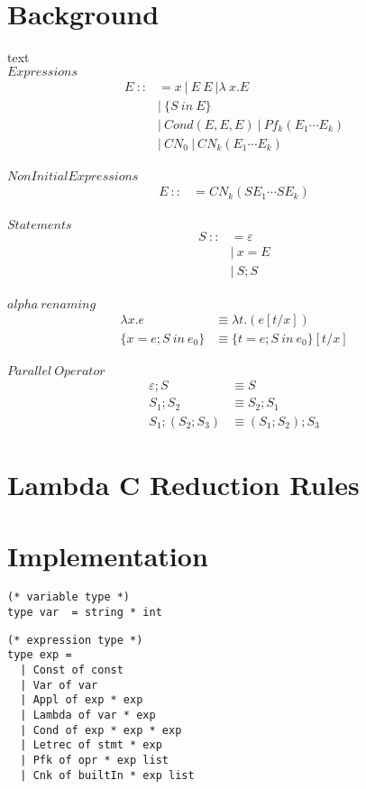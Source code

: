 \documentclass[preprint]{sigplanconf}
\begin{document}
\section{Background}
text 
\\
$Expressions$ \cite{lambdas}
\begin{align}
E\ ::&= x\ |\ E\ E\ | \lambda\ x.E \\
&|\ \lbrace S\ in\ E \rbrace \\
&|\ Cond(E,E,E)\ |\ Pf_{k}(E_{1}\cdots E_{k}) \\
&|\ CN_{0}\ |\ CN_{k}(E_{1}\cdots E_{k}) 
\end{align}
\\
$Non Initial Expressions$
\begin{align}
E\ ::&= CN_{k}(SE_{1}\cdots SE_{k}) 
\end{align}
\\
$Statements$
\begin{align}
S\ ::&= \varepsilon\\
&|\ x = E\\
&|\ S;S 
\end{align}
\\
$alpha\ renaming$ 
\begin{align} 
\lambda x.e &\equiv \lambda t.(e[t/x]) \\
\lbrace x=e ; S\ in\ e_{0} \rbrace &\equiv \lbrace t = e; S\ in\ e_{0}  \rbrace [t/x]
\end{align}
\\
$Parallel\ Operator$
\begin{align}
\varepsilon ; S &\equiv S \\
S_{1} ; S_{2} &\equiv S_{2} ; S_{1}\\
S_{1} ; (S_{2} ; S_{3}) &\equiv (S_{1} ; S_{2}) ; S_{3}
\end{align}

\section{Lambda C Reduction Rules}

\section{Implementation}

\begin{verbatim}
(* variable type *)
type var  = string * int
\end{verbatim}

\begin{verbatim}
(* expression type *)
type exp =
  | Const of const
  | Var of var
  | Appl of exp * exp
  | Lambda of var * exp
  | Cond of exp * exp * exp
  | Letrec of stmt * exp
  | Pfk of opr * exp list
  | Cnk of builtIn * exp list 
\end{verbatim}
\end{document}
